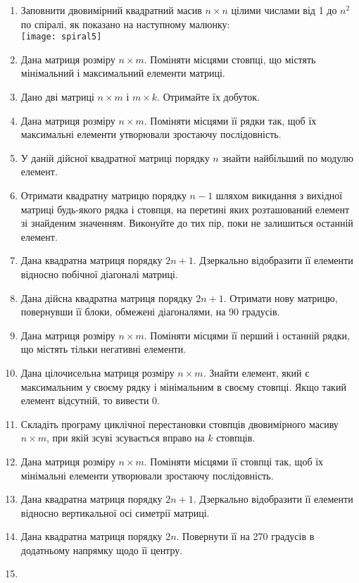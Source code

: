 \documentclass[]{article}
\begin{document}
\begin{enumerate}
\item
  Заповнити двовимірний квадратний масив $n\times n$ цілими числами від 1 до $n^2$ по
  спіралі, як показано на наступному малюнку:\\
  \texttt{[image: spiral5]}
   
\item
  Дана матриця розміру $n \times m$. Поміняти місцями стовпці, що містять
  мінімальний і максимальний елементи матриці.
\item
  Дано дві матриці $n \times m$ і $m \times k$. Отримайте їх добуток.
\item
  Дана матриця розміру $n \times m$. Поміняти місцями її рядки так, щоб їх
  максимальні елементи утворювали зростаючу послідовність.
\item
  У даній дійсної квадратної матриці порядку $n$ знайти найбільший по
  модулю елемент.
\item
  Отримати квадратну матрицю порядку $n - 1$ шляхом викидання з вихідної
  матриці будь-якого рядка і стовпця, на перетині яких розташований
  елемент зі знайденим значенням. Виконуйте до тих пір, поки не
  залишиться останній елемент.
\item
  Дана квадратна матриця порядку $2n + 1$. Дзеркально відобразити її
  елементи відносно побічної діагоналі матриці.
\item
  Дана дійсна квадратна матриця порядку $2n + 1$. Отримати нову матрицю,
  повернувши її блоки, обмежені діагоналями, на 90 градусів.
\item
  Дана матриця розміру $n \times m$. Поміняти місцями її перший і останній
  рядки, що містять тільки негативні елементи.
\item
  Дана цілочисельна матриця розміру $n \times m$. Знайти елемент, який є
  максимальним у своєму рядку і мінімальним в своєму стовпці. Якщо такий
  елемент відсутній, то вивести 0.
\item
  Складіть програму циклічної перестановки стовпців двовимірного масиву
  $n \times m$, при якій зсуві зсувається вправо на $k$ стовпців.
\item
  Дана матриця розміру $n \times m$. Поміняти місцями її стовпці так, щоб їх
  мінімальні елементи утворювали зростаючу послідовність.
\item
  Дана квадратна матриця порядку $2n + 1$. Дзеркально відобразити її
  елементи відносно вертикальної осі симетрії матриці.
\item
  Дана квадратна матриця порядку $2n$. Повернути її на 270 градусів в
  додатньому напрямку щодо її центру.
\item

\end{enumerate}
\end{document}
